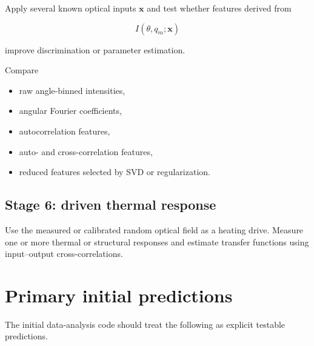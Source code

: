 \documentclass[11pt,letterpaper]{article}
\begin{document}
Apply several known optical inputs $\bm{x}$ and test whether features derived
from

\begin{equation}
    I(\theta,q_m;\bm{x})
\end{equation}

improve discrimination or parameter estimation.

Compare

\begin{itemize}[leftmargin=2em]
    \item raw angle-binned intensities,
    \item angular Fourier coefficients,
    \item autocorrelation features,
    \item auto- and cross-correlation features,
    \item reduced features selected by SVD or regularization.
\end{itemize}

\subsection{Stage 6: driven thermal response}

Use the measured or calibrated random optical field as a heating drive.
Measure one or more thermal or structural responses and estimate transfer
functions using input--output cross-correlations.

\section{Primary initial predictions}

The initial data-analysis code should treat the following as explicit
testable predictions.
\end{document}
